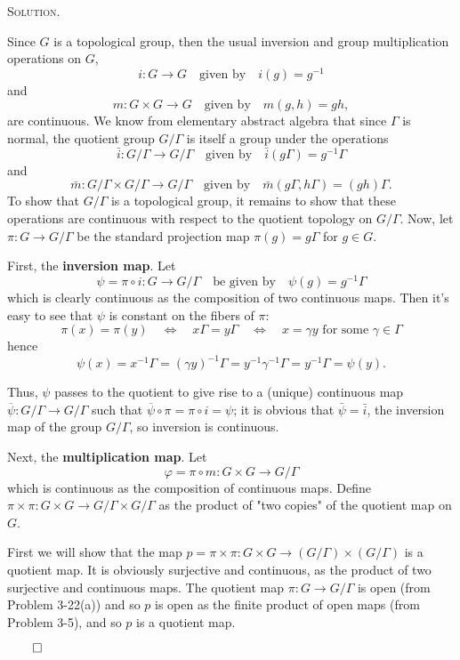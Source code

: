 \documentclass[12pt, a4paper, oneside]{ctexart}
\newenvironment{solution}{%
	\par\noindent\textsc{Solution. }\ignorespaces
}{%
	\hfill$\qed$\par
}
\begin{document}
	\begin{solution}
	Since $G$ is a topological group, then the usual inversion and 
	group multiplication operations on \( G \),
	\[
	i : G \to G \quad \text{given by} \quad i(g) = g^{-1}
	\]
	and
	\[
	m : G \times G \to G \quad \text{given by} \quad m(g, h) = gh,
	\]
	are continuous. We know from elementary abstract algebra that since
	\( \Gamma \) is normal, the quotient group \( G/\Gamma \) is itself a group 
	under the operations
	\[
	\bar{i} : G/\Gamma \to G/\Gamma \quad \text{given by} \quad \bar{i}(g\Gamma) = g^{-1}\Gamma
	\]
	and
	\[
	\bar{m} : G/\Gamma \times G/\Gamma \to G/\Gamma \quad \text{given by} \quad \bar{m}(g\Gamma, h\Gamma) = (gh)\Gamma.
	\]
	To show that \( G/\Gamma \) is a topological group, 
	it remains to show that these operations are continuous 
	with respect to the quotient topology on \( G/\Gamma \). 
	Now, let \( \pi : G \to G/\Gamma \) be the standard 
	projection map \( \pi(g) = g\Gamma \) for \( g \in G \).
	
	First, the \textbf{inversion map}. Let
	\[
	\psi = \pi \circ i : G \to G/\Gamma \quad \text{be given by} \quad \psi(g) = g^{-1}\Gamma
	\]
	which is clearly continuous as the composition of two continuous maps. 
	Then it's easy to see that \( \psi \) is constant on the fibers of \( \pi \):
	\[
	\pi(x) = \pi(y) \quad \Longleftrightarrow \quad x\Gamma = y\Gamma \quad \Longleftrightarrow \quad x = \gamma y \text{ for some } \gamma \in \Gamma
	\]
	hence
	\[
	\psi(x) = x^{-1} \Gamma = (\gamma y)^{-1} \Gamma = y^{-1} \gamma^{-1} \Gamma = y^{-1} \Gamma = \psi(y).
	\]

	Thus, \( \psi \) passes to the quotient to give rise to a (unique) 
	continuous map \( \overline{\psi} : G/\Gamma \to G/\Gamma \) 
	such that \( \overline{\psi} \circ \pi = \pi \circ i = \psi \); 
	it is obvious that \( \bar{\psi} = \bar{i} \), the inversion map of the group \( G/\Gamma \), 
	so inversion is continuous.

	Next, the \textbf{multiplication map}. Let
	\[
	\varphi = \pi \circ m : G \times G \to G/\Gamma
	\]
	which is continuous as the composition of continuous maps. 
	Define \( \pi \times \pi : G \times G \to G/\Gamma \times G/\Gamma \) 
	as the product of "two copies" of the quotient map on \( G \).
	
	First we will show that the map 
	\( p = \pi \times \pi : G \times G \to (G/\Gamma) \times (G/\Gamma) \) 
	is a quotient map. It is obviously surjective and continuous, 
	as the product of two surjective and continuous maps. 
	The quotient map \( \pi : G \to G/\Gamma \) is open (from Problem 3-22(a))
	and so \( p \) is open as the finite product of open maps 
	(from Problem 3-5), and so \( p \) is a quotient map.


\end{solution}
\end{document}

